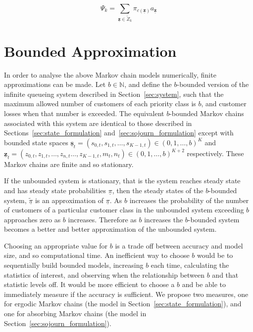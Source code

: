 \documentclass{article}
\begin{document}
\begin{equation}\label{eqn:mean_sojourn_class_k}
\Psi_k = \sum_{\underline{\mathbf{z}} \in \tilde{Z}_k} \pi_{c(\underline{\mathbf{z}})} a_{\underline{\mathbf{z}}}
\end{equation}



\section{Bounded Approximation}\label{sec:bound}
In order to analyse the above Markov chain models numerically, finite
approximations can be made. Let $b \in \mathbb{N}$, and define the $b$-bounded
version of the infinite queueing system described in Section~\ref{sec:system},
such that the maximum allowed number of customers of each priority class is $b$,
and customer losses when that number is exceeded. The equivalent $b$-bounded
Markov chains associated with this system are identical to those described in
Sections~\ref{sec:state_formulation} and~\ref{sec:sojourn_formulation} except
with bounded state spaces
$\underline{\mathbf{s}}_t = (s_{0,t}, s_{1,t}, \dots, s_{K-1,t}) \in (0, 1, \dots, b)^K$ and
$\underline{\mathbf{z}}_t = (z_{0,t}, z_{1,t}, \dots, z_{n,t} \dots, z_{K-1,t}, m_t, n_t) \in (0, 1, \dots, b)^{K+2}$
respectively. These Markov chains are finite and so stationary.

If the unbounded system is stationary, that is the system reaches steady state
and has steady state probabilities $\underline{\pi}$, then the steady states of
the $b$-bounded system, $\underline{\tilde{\pi}}$ is an approximation of
$\underline{\pi}$. As $b$ increases the probability of the number of
customers of a particular customer class in the unbounded system exceeding $b$
approaches zero as $b$ increases. Therefore as $b$ increases the $b$-bounded
system becomes a better and better approximation of the unbounded system.

Choosing an appropriate value for $b$ is a trade off between accuracy and model
size, and so computational time. An inefficient way to choose $b$ would be to
sequentially build bounded models, increasing $b$ each time, calculating the
statistics of interest, and observing when the relationship between $b$ and that
statistic levels off.
It would be more efficient to choose a $b$ and be able to immediately measure if
the accuracy is sufficient. We propose two measures, one for ergodic Markov
chains (the model in Section~\ref{sec:state_formulation}), and one for absorbing
Markov chains (the model in Section~\ref{sec:sojourn_formulation}).
\end{document}
